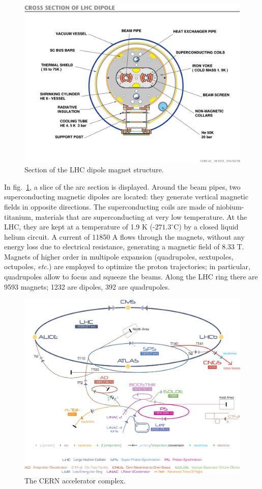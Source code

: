 \begin{figure}[!htb]
  \centering
    \includegraphics[width=.6\textwidth]{figures/LHC-magnets.jpg}
  \caption{Section of the LHC dipole magnet structure.~\cite{Jean-Luc:841539}}
  \label{fig:LHC_dipole}
\end{figure}

\noindent In fig.~\ref{fig:LHC_dipole}, a slice of the arc section is displayed. Around the beam pipes, two superconducting magnetic dipoles are located: they generate vertical magnetic fields in opposite directions. The superconducting coils are made of niobium-titanium, materials that are superconducting at very low temperature. At the LHC, they are kept at a temperature of 1.9 K (-$271.3^{\circ}$C) by a closed liquid helium circuit. A current of 11850 A flows through the magnets, without any energy loss due to electrical resistance, generating a magnetic field of 8.33 T. Magnets of higher order in multipole expansion (quadrupoles, sextupoles, octupoles, \textit{etc.}) are employed to optimize the proton trajectories; in particular, quadrupoles allow to focus and squeeze the beams. Along the LHC ring there are 9593 magnets; 1232 are dipoles, 392 are quadrupoles.

\begin{figure}[!htb]
  \centering
    \includegraphics[width=.75\textwidth]{figures/Cern-Accelerator-Complex.jpg}
  \caption{The CERN accelerator complex.~\cite{accelerator:1997193}}
  \label{fig:LHC_accelerator_complex}
\end{figure}

